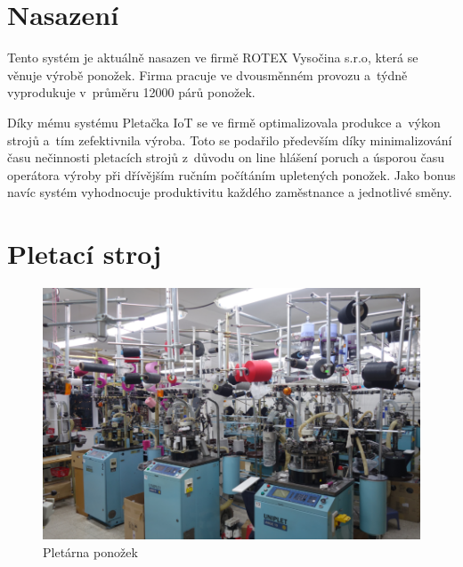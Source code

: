 \section{Nasazení}
Tento systém je aktuálně nasazen ve firmě ROTEX Vysočina s.r.o\cite{ROTEX}, která se věnuje výrobě ponožek. 
Firma pracuje ve dvousměnném provozu a~týdně vyprodukuje v~průměru 12000 párů ponožek. 

Díky mému systému Pletačka IoT se ve firmě optimalizovala produkce a výkon strojů a tím zefektivnila výroba. 
Toto se podařilo především díky minimalizování času nečinnosti pletacích strojů z důvodu on line hlášení poruch a úsporou času operátora výroby při dřívějším ručním počítáním upletených ponožek. 
Jako bonus navíc systém vyhodnocuje produktivitu každého zaměstnance a jednotlivé směny.


\section{Pletací stroj}



\begin{figure}[htbp]
    \centering
    \includegraphics[width=\textwidth]{img/pletarna.png}
    \caption{Pletárna ponožek}
    \label{fig:Pletarna}
\end{figure}



\newpage